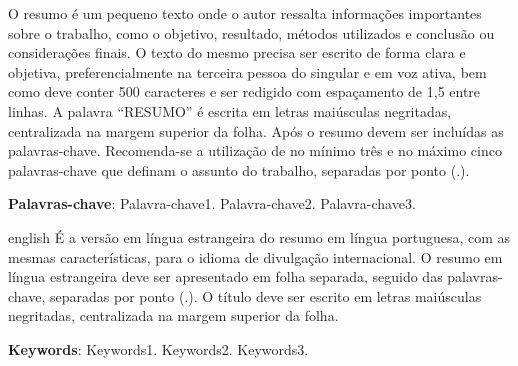 

\begin{resumonew}


O resumo é um pequeno texto onde o autor ressalta informações importantes sobre o
trabalho, como o objetivo, resultado, métodos utilizados e conclusão ou considerações finais.
O texto do mesmo precisa ser escrito de forma clara e objetiva, preferencialmente na terceira
pessoa do singular e em voz ativa, bem como deve conter 500 caracteres e ser redigido com espaçamento de 1,5 entre linhas.
A palavra “RESUMO” é escrita em letras maiúsculas negritadas, centralizada na margem
superior da folha.
Após o resumo devem ser incluídas as palavras-chave. Recomenda-se a utilização de no
mínimo três e no máximo cinco palavras-chave que definam o assunto do trabalho, separadas
por ponto (.).

 \vspace{\onelineskip}
 \noindent
 \textbf{Palavras-chave}: Palavra-chave1. Palavra-chave2. Palavra-chave3. 
\end{resumonew}

\begin{resumonew}[\resumonameeng]
 \begin{otherlanguage*}{english}
   É a versão em língua estrangeira do resumo em língua portuguesa, com as mesmas características, para o idioma de divulgação internacional. O resumo em língua estrangeira deve ser apresentado em folha separada, seguido das palavras-chave, separadas por ponto (.). 
   O título deve ser escrito em letras maiúsculas negritadas, centralizada na margem superior da folha. 


   \vspace{\onelineskip}
   \noindent 
   \textbf{Keywords}: Keywords1. Keywords2. Keywords3.
 \end{otherlanguage*}
\end{resumonew}